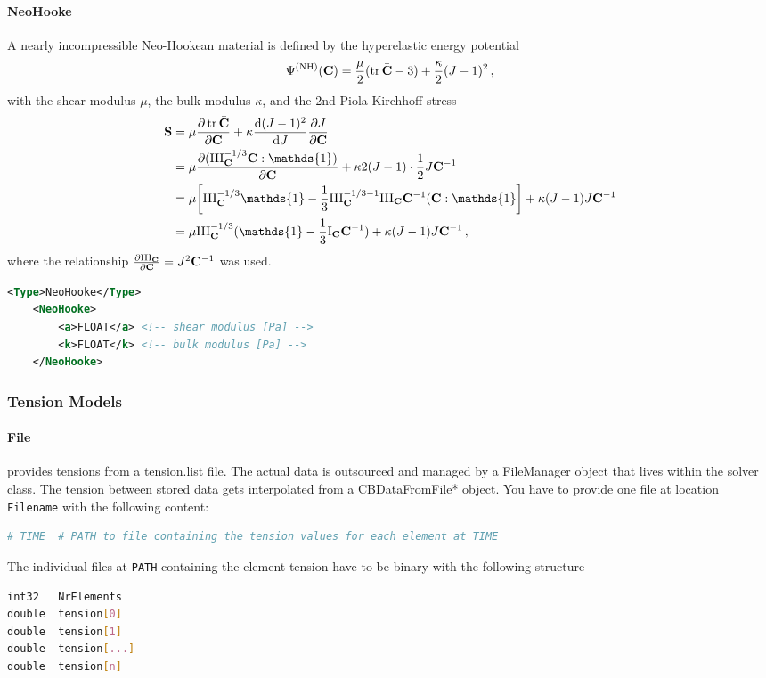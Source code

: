 \paragraph{NeoHooke}
A nearly incompressible Neo-Hookean material is defined by the hyperelastic energy potential
\begin{equation}
    \Psi^{(\mathrm{NH})} (\vec C) = \frac{\mu}{2} (\tr \bar{\vec C} - 3) + \frac{\kappa}{2}(J-1)^2 \,, \label{eq:neohooke}
\end{equation}
with the shear modulus $\mu$, the bulk modulus $\kappa$, and the 2nd Piola-Kirchhoff stress
\begin{align}
    \vec S &= \mu \pdv{\tr \bar{\vec C}}{\vec C} + \kappa \dv{(J-1)^2}{J} \pdv{J}{\vec C} \nonumber \\
    &= \mu \pdv{( \III{C}^{-1/3} \vec C : \mathds{1} )}{\vec C}  + \kappa 2(J-1) \cdot \frac{1}{2} J \vec C^{-1} \nonumber \\
    &= \mu \qty[\III{C}^{-1/3} \mathds{1} - \frac{1}{3}\III{C}^{-1/3 - 1} \III{C} \vec C^{-1} (\vec C : \mathds{1}] + \kappa (J-1) J \vec C^{-1} \nonumber  \\
    &= \mu \III{C}^{-1/3} (\mathds{1} - \frac{1}{3} \I{C} \vec C^{-1}) + \kappa (J-1) J \vec C^{-1} \,,
\end{align}
where the relationship $\pdv{\III{C}}{\vec C} = J^2 \vec C^{-1}$ was used.

\begin{lstlisting}[language=XML,caption=.xml settings for NeoHooke material]
    <Type>NeoHooke</Type>
    <NeoHooke>
        <a>FLOAT</a> <!-- shear modulus [Pa] -->
        <k>FLOAT</k> <!-- bulk modulus [Pa] -->
    </NeoHooke>
\end{lstlisting}

\subsubsection{Tension Models}

\paragraph{File} provides tensions from a tension.list file. 
The actual data is outsourced and managed by a FileManager object that lives within the solver class. 
The tension between stored data gets interpolated from a CBDataFromFile* object.
You have to provide one file at location \verb|Filename| with the following content:
\begin{lstlisting}[language=Bash,caption=File structure of a tension.list file]
# TIME  # PATH to file containing the tension values for each element at TIME
\end{lstlisting}
The individual files at \verb|PATH| containing the element tension have to be binary with the following structure
\begin{lstlisting}[language=Bash,caption=File structure of individual tension files]
int32   NrElements
double  tension[0]
double  tension[1]
double  tension[...]
double  tension[n]
\end{lstlisting}

